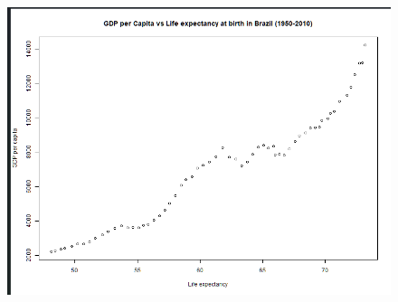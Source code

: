 \documentclass{article}
\begin{document}
\begin{figure}[H]
    \centering
    \includegraphics[width=1\linewidth]{imagesfolder/image18.png}
\end{figure}
\end{document}
